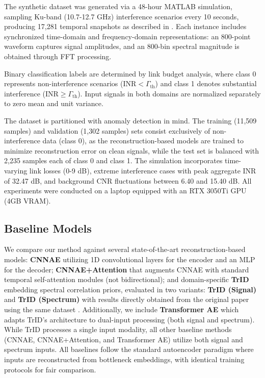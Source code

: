 \documentclass[conference]{IEEEtran}
\begin{document}
The synthetic dataset was generated via a 48-hour MATLAB simulation, sampling Ku-band (10.7-12.7 GHz) interference scenarios every 10 seconds, producing 17,281 temporal snapshots as described in \cite{saifaldawlaGenAIBasedModelsNGSO2024}. Each instance includes synchronized time-domain and frequency-domain representations: an 800-point waveform captures signal amplitudes, and an 800-bin spectral magnitude is obtained through FFT processing.

Binary classification labels are determined by link budget analysis, where class 0 represents non-interference scenarios ($\text{INR} < \Gamma_{\text{th}}$) and class 1 denotes substantial interference ($\text{INR} \geq \Gamma_{\text{th}}$). Input signals in both domains are normalized separately to zero mean and unit variance.

The dataset is partitioned with anomaly detection in mind. The training (11,509 samples) and validation (1,302 samples) sets consist exclusively of non-interference data (class 0), as the reconstruction-based models are trained to minimize reconstruction error on clean signals, while the test set is balanced with 2,235 samples each of class 0 and class 1. The simulation incorporates time-varying link losses (0-9 dB), extreme interference cases with peak aggregate INR of 32.47 dB, and background CNR fluctuations between 6.40 and 15.40 dB. All experiments were conducted on a laptop equipped with an RTX 3050Ti GPU (4GB VRAM).



\subsection{Baseline Models}

We compare our method against several state-of-the-art reconstruction-based models: \textbf{CNNAE} utilizing 1D convolutional layers for the encoder and an MLP for the decoder; \textbf{CNNAE+Attention} that augments CNNAE with standard temporal self-attention modules (not bidirectional); and domain-specific \textbf{TrID}  embedding spectral correlation priors, evaluated in two variants: \textbf{TrID (Signal)} and \textbf{TrID (Spectrum)} with results directly obtained from the original paper using the same dataset \cite{saifaldawlaGenAIBasedModelsNGSO2024}. Additionally, we include \textbf{Transformer AE} which adapts TrID's architecture to dual-input processing (both signal and spectrum). While TrID processes a single input modality, all other baseline methods (CNNAE, CNNAE+Attention, and Transformer AE) utilize both signal and spectrum inputs. All baselines follow the standard autoencoder paradigm where inputs are reconstructed from bottleneck embeddings, with identical training protocols for fair comparison.
\end{document}
